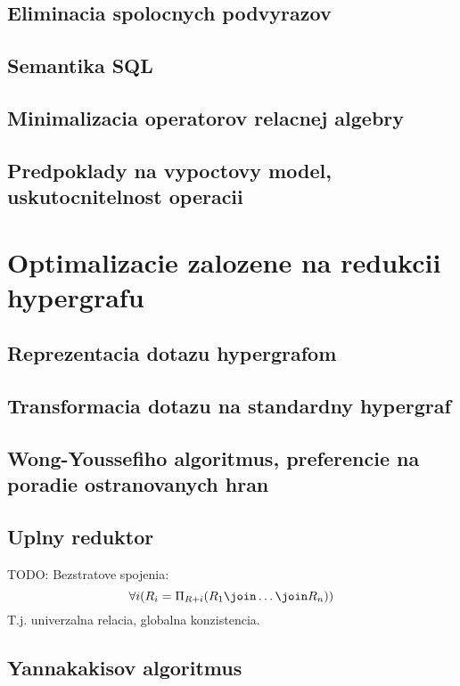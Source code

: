 \documentclass[12pt,a4paper]{article}
\begin{document}
\subsection{Eliminacia spolocnych podvyrazov}

\subsection{Semantika SQL}

\subsection{Minimalizacia operatorov relacnej algebry}

\subsection{Predpoklady na vypoctovy model, uskutocnitelnost operacii}

\section{Optimalizacie zalozene na redukcii hypergrafu}

\subsection{Reprezentacia dotazu hypergrafom}

\subsection{Transformacia dotazu na standardny hypergraf}

\subsection{Wong-Youssefiho algoritmus, preferencie na poradie ostranovanych hran}

\subsection{Uplny reduktor}
TODO: Bezstratove spojenia: 
$$
\forall i (R_i = \Pi_{R+i}(R_1 \join \ldots \join R_n))
$$
T.j. univerzalna relacia, globalna konzistencia. 

\subsection{Yannakakisov algoritmus}
\end{document}
